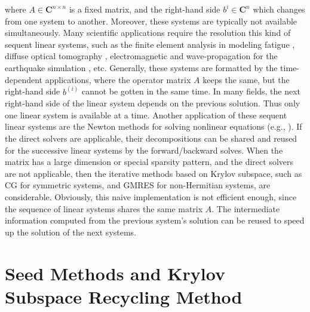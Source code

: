 where $A \in \mathbf{C}^{n\times n}$ is a fixed matrix, and the right-hand side $b^{i} \in \mathbf{C}^n$ which changes from one system to another. Moreover, these systems are typically not available simultaneously. Many scientific applications require the resolution this kind of sequent linear systems, such as the finite element analysis in modeling fatigue \cite{newman1976finite, gullerud2001mpi,sukumar2003extended}, diffuse optical tomography \cite{kilmer2006recycling,arridge1993finite,schweiger1995finite}, electromagnetic \cite{bastos2003electromagnetic,pridmore1981investigation, ye2008generalized} and wave-propagation for the earthquake simulation \cite{Fujita:2018:WPS:3149457.3149474,moczo2007finite,chen2015transient}, etc. Generally, these systems are formatted by the time-dependent applications, where the operator matrix $A$ keeps the same, but the right-hand side $b^{(i)}$ cannot be gotten in the same time. In many fields, the next right-hand side of the linear system depends on the previous solution. Thus only one linear system is available at a time. Another application of these sequent linear systems are the Newton methods for solving nonlinear equations (e.g., \cite{brown1990hybrid,knoll2004jacobian,bellavia2001globally,flueck1998solving,an2007globally}). If the direct solvers are applicable, their decompositions can be shared and reused for the successive linear systems by the forward/backward solves. When the matrix has a large dimension or special sparsity pattern, and the direct solvers are not applicable, then the iterative methods based on Krylov subspace, such as CG for symmetric systems, and GMRES for non-Hermitian systems, are considerable. Obviously, this naive implementation is not efficient enough, since the sequence of linear systems shares the same matrix $A$. The intermediate information computed from the previous system's solution can be reused to speed up the solution of the next systems.



\section{Seed Methods and Krylov Subspace Recycling Method}

